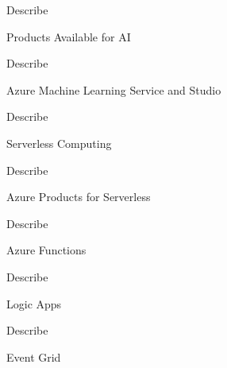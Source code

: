 \documentclass{scrartcl}
\newenvironment{flashcard}[2][]{%
    #1
    \vfill
    \centerline{\Large{#2}}
    \vfill
    \newpage
}
{\newpage}
\begin{document}
    \begin{flashcard}[Describe]{Products Available for AI}

    \end{flashcard}

    \begin{flashcard}[Describe]{Azure Machine Learning Service and Studio}

    \end{flashcard}

    \begin{flashcard}[Describe]{Serverless Computing}

    \end{flashcard}

    \begin{flashcard}[Describe]{Azure Products for Serverless}

    \end{flashcard}

    \begin{flashcard}[Describe]{Azure Functions}

    \end{flashcard}

    \begin{flashcard}[Describe]{Logic Apps}

    \end{flashcard}

    \begin{flashcard}[Describe]{Event Grid}

    \end{flashcard}
\end{document}
